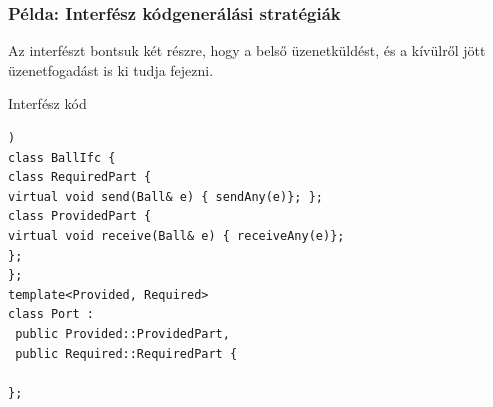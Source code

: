 \documentclass[11pt]{beamer}
\begin{document}
\begin{frame}[fragile]
	\frametitle{Példa: Interfész kódgenerálási stratégiák}
	
	Az interfészt bontsuk két részre, hogy a belső üzenetküldést, és a kívülről jött üzenetfogadást is ki tudja fejezni. 
	
	\begin{block}{Interfész kód}
	\begin{lstlisting}[basicstyle=\small])
class BallIfc {
class RequiredPart {
virtual void send(Ball& e) { sendAny(e)}; };
class ProvidedPart {
virtual void receive(Ball& e) { receiveAny(e)}; 
};
};
template<Provided, Required>
class Port :
 public Provided::ProvidedPart, 
 public Required::RequiredPart { 

};
	\end{lstlisting}
	\end{block}

\end{frame}
\end{document}
